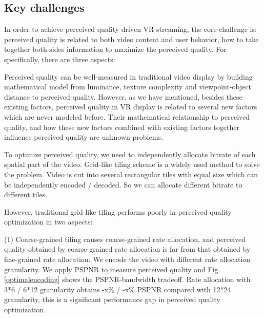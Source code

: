 \subsection{Key challenges}
In order to achieve perceived quality driven VR streaming, the core challenge is: perceived quality is related to both video content and user behavior, how to take together both-sides information to maximize the perceived quality. For specifically, there are three aspects:

Perceived quality can be well-measured in traditional video display by building mathematical model from luminance, texture complexity and viewpoint-object distance to perceived quality. However, as we have mentioned, besides these existing factors, perceived quality in VR display is related to several new factors which are never modeled before. Their mathematical relationship to perceived quality, and how these new factors combined with existing factors together influence perceived quality are unknown problems.

To optimize perceived quality, we need to independently allocate bitrate of each spatial part of the video. Grid-like tiling scheme is a widely used method to solve the problem. Video is cut into several rectangular tiles with equal size which can be independently encoded / decoded. So we can allocate different bitrate to different tiles.

However, traditional grid-like tiling performs poorly in perceived quality optimization in two aspects: 

(1) Coarse-grained tiling causes coarse-grained rate allocation, and perceived quality obtained by coarse-grained rate allocation is far from that obtained by fine-grained rate allocation. We encode the video with different rate allocation granularity. We apply PSPNR to measure perceived quality and Fig. \ref{optimalencoding} shows the PSPNR-bandwidth tradeoff. Rate allocation with 3*6 / 6*12 granularity obtains -x\% / -x\% PSPNR compared with 12*24 granularity, this is a significant performance gap in perceived quality optimization.

